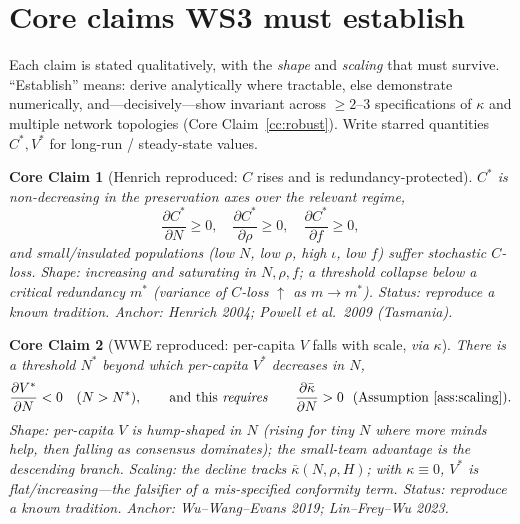 \documentclass[11pt,letterpaper]{article}
\theoremstyle{definition}
\theoremstyle{plain}
\newtheorem{coreclaim}{Core Claim}
\begin{document}
\section{Core claims WS3 must establish}\label{sec:claims}

Each claim is stated qualitatively, with the \emph{shape} and \emph{scaling} that
must survive. ``Establish'' means: derive analytically where tractable, else
demonstrate numerically, and---decisively---show invariant across
$\ge\!2$--$3$ specifications of $\kappa$ and multiple network topologies
(Core Claim~\ref{cc:robust}). Write starred quantities $C^\ast,V^\ast$ for
long-run / steady-state values.

\begin{coreclaim}[Henrich reproduced: $C$ rises and is redundancy-protected]\label{cc:henrich}
$C^\ast$ is non-decreasing in the preservation axes over the relevant regime,
\[
  \frac{\partial C^\ast}{\partial N}\ge 0,\quad
  \frac{\partial C^\ast}{\partial \rho}\ge 0,\quad
  \frac{\partial C^\ast}{\partial f}\ge 0,
\]
and small/insulated populations (low $N$, low $\rho$, high $\iota$, low $f$)
suffer stochastic $C$-loss.
\emph{Shape:} increasing and \emph{saturating} in $N,\rho,f$; a
\emph{threshold} collapse below a critical redundancy $m^\ast$ (variance of
$C$-loss $\uparrow$ as $m\to m^\ast$). \emph{Status:} reproduce a known
tradition. \emph{Anchor:} Henrich 2004; Powell et al.\ 2009 (Tasmania).
\end{coreclaim}

\begin{coreclaim}[WWE reproduced: per-capita $V$ falls with scale, \emph{via} $\kappa$]\label{cc:wwe}
There is a threshold $N^\ast$ beyond which per-capita $V^\ast$ decreases in $N$,
\[
  \frac{\partial V^\ast}{\partial N} < 0 \quad (N>N^\ast),
  \qquad\text{and this \emph{requires}}\qquad
  \frac{\partial \bar\kappa}{\partial N} > 0 \ \ (\text{Assumption~\ref{ass:scaling}}).
\]
\emph{Shape:} per-capita $V$ is \emph{hump-shaped} in $N$ (rising for tiny $N$
where more minds help, then falling as consensus dominates); the small-team
advantage is the descending branch. \emph{Scaling:} the decline tracks
$\bar\kappa(N,\rho,H)$; with $\kappa\equiv 0$, $V^\ast$ is flat/increasing---the
falsifier of a mis-specified conformity term. \emph{Status:} reproduce a known
tradition. \emph{Anchor:} Wu--Wang--Evans 2019; Lin--Frey--Wu 2023.
\end{coreclaim}
\end{document}
